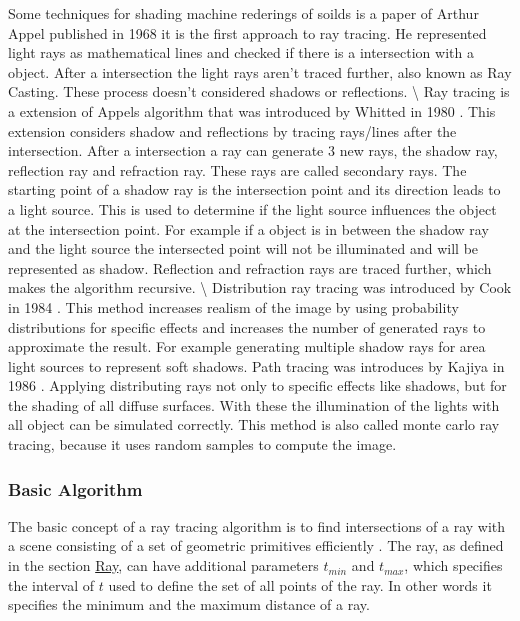 Some techniques for shading machine rederings of soilds is a paper of
Arthur Appel published in 1968 \cite{appel} it is the first approach to
ray tracing. He represented light rays as mathematical lines and checked
if there is a intersection with a object. After a intersection the light
rays aren't traced further, also known as Ray Casting. These process
doesn't considered shadows or reflections. \textbackslash{} Ray tracing
is a extension of Appels algorithm that was introduced by Whitted in
1980 \cite{whitt}. This extension considers shadow and reflections by
tracing rays/lines after the intersection. After a intersection a ray
can generate 3 new rays, the shadow ray, reflection ray and refraction
ray. These rays are called secondary rays. The starting point of a
shadow ray is the intersection point and its direction leads to a light
source. This is used to determine if the light source influences the
object at the intersection point. For example if a object is in between
the shadow ray and the light source the intersected point will not be
illuminated and will be represented as shadow. Reflection and refraction
rays are traced further, which makes the algorithm recursive.
\textbackslash{} Distribution ray tracing was introduced by Cook in 1984
\cite{cook}. This method increases realism of the image by using
probability distributions for specific effects and increases the number
of generated rays to approximate the result. For example generating
multiple shadow rays for area light sources to represent soft shadows.
Path tracing was introduces by Kajiya in 1986 \cite{kaji}. Applying
distributing rays not only to specific effects like shadows, but for the
shading of all diffuse surfaces. With these the illumination of the
lights with all object can be simulated correctly. This method is also
called monte carlo ray tracing, because it uses random samples to
compute the image.

\subsubsection{Basic Algorithm}\label{basic-algorithm}

The basic concept of a ray tracing algorithm is to find intersections of
a ray with a scene consisting of a set of geometric primitives
efficiently \cite{wald}. The ray, as defined in the section
\hyperref[ray]{Ray}, can have additional parameters $t_{min}$ and
$t_{max}$, which specifies the interval of $t$ used to define the set of
all points of the ray. In other words it specifies the minimum and the
maximum distance of a ray.

